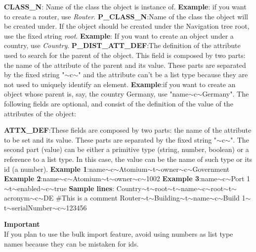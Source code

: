 \documentclass[a4paper]{article}
\begin{document}
				\textbf{CLASS\_N}: Name of the class the object is instance of. \textbf{Example}: if you want to create a router, use \textit{Router}.
				\newline
				\textbf{P\_CLASS\_N}:Name of the class the object will be created under. If the object should be created under the Navigation tree root, use the fixed string \textit{root}. \textbf{Example}: If  you  want  to create an object under a country, use \textit{Country}.
			    \newline
				\textbf{P\_DIST\_ATT\_DEF}:The definition of the attribute used to search for the parent of the object. This field is composed by two parts: the name of the attribute of the parent and its value. These parts are separated by the fixed string "$\sim$c$\sim$" and the attribute can’t be a list type because they are not used to uniquely identify an element. \textbf{Example}:if you want to create an object whose parent is, say, the country Germany, use "name$\sim$c$\sim$Germany".
				\newline
				\newline
				The following fields are optional, and consist of the definition of the value of the attributes of the object:
			
				\textbf{ATTX\_DEF}:These fields are composed by two parts: the name of the attribute to be set and its value. These parts are separated by the fixed string "$\sim$c$\sim$". The second part (value) can be either a primitive type (string, number, boolean) or a reference to a list type. In this case, the value can be the name of such type or its id (a number).
				\newline 
				\newline 
				\textbf{Example 1}:name$\sim$c$\sim$Atomium$\sim$t$\sim$owner$\sim$c$\sim$Government
				\newline 
				\textbf{Example 2}:name$\sim$c$\sim$Atomium$\sim$t$\sim$owner$\sim$c$\sim$1002
				\newline 
				\textbf{Example 3}:name$\sim$c$\sim$Port 1$\sim$t$\sim$enabled$\sim$c$\sim$true
				\newline 
				\newline
				\textbf{Sample lines}: Country$\sim$t$\sim$root$\sim$t$\sim$name$\sim$c$\sim$root$\sim$t$\sim$acronym$\sim$c$\sim$DE
				\newline 
				\#This is a comment 
				\newline 
				Router$\sim$t$\sim$Building$\sim$t$\sim$name$\sim$c$\sim$Build 1$\sim$t$\sim$serialNumber$\sim$c$\sim$123456			
				\begin{framed} {\large \textbf{Important}}\\
					If you plan to use the bulk import feature, avoid using numbers as list type names because they can be mistaken for ids.	
				\end{framed}
\end{document}
